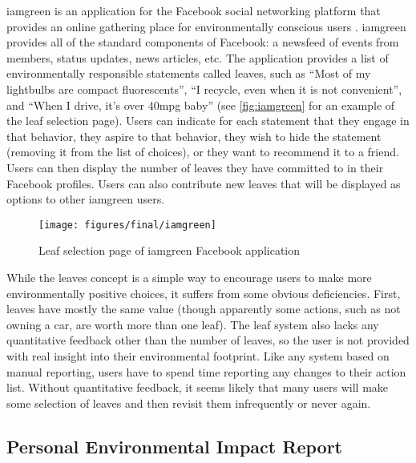iamgreen is an application for the Facebook social networking platform that provides an online gathering place for environmentally conscious users \cite{iamgreen-website}. iamgreen provides all of the standard components of Facebook: a newsfeed of events from members, status updates, news articles, etc. The application provides a list of environmentally responsible statements called leaves, such as ``Most of my lightbulbs are compact fluorescents'', ``I recycle, even when it is not convenient'', and ``When I drive, it's over 40mpg baby'' (see \autoref{fig:iamgreen} for an example of the leaf selection page). Users can indicate for each statement that they engage in that behavior, they aspire to that behavior, they wish to hide the statement (removing it from the list of choices), or they want to recommend it to a friend. Users can then display the number of leaves they have committed to in their Facebook profiles. Users can also contribute new leaves that will be displayed as options to other iamgreen users.

\begin{figure}[htbp]
	\begin{center}
		\texttt{[image: figures/final/iamgreen]}
		\caption{Leaf selection page of iamgreen Facebook application}
		\label{fig:iamgreen}
 	\end{center}
\end{figure}

While the leaves concept is a simple way to encourage users to make more environmentally positive choices, it suffers from some obvious deficiencies. First, leaves have mostly the same value (though apparently some actions, such as not owning a car, are worth more than one leaf). The leaf system also lacks any quantitative feedback other than the number of leaves, so the user is not provided with real insight into their environmental footprint. Like any system based on manual reporting, users have to spend time reporting any changes to their action list. Without quantitative feedback, it seems likely that many users will make some selection of leaves and then revisit them infrequently or never again.

\subsection{Personal Environmental Impact Report}

